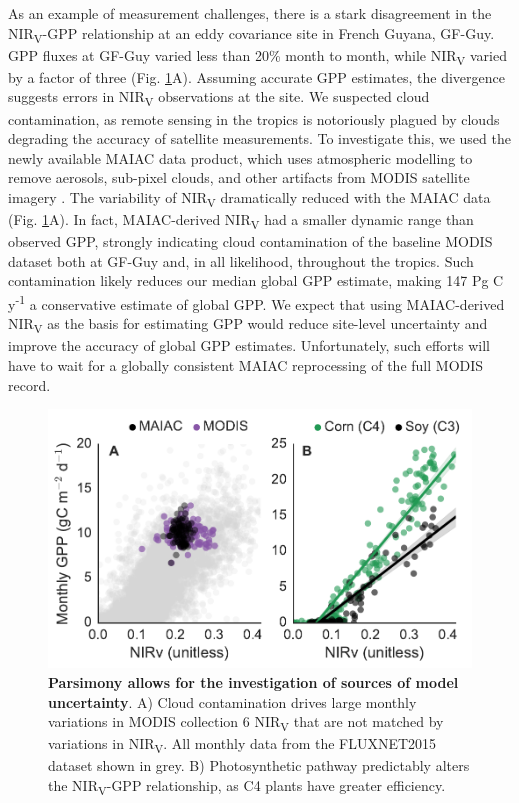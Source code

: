 \documentclass[10pt,letterpaper]{article}
\begin{document}
As an example of measurement challenges, there is a stark disagreement in the NIR\textsubscript{V}-GPP relationship at an eddy covariance site in French Guyana, GF-Guy. GPP fluxes at GF-Guy varied less than 20\% month to month, while NIR\textsubscript{V} varied by a factor of three (Fig. \ref{fig:parsimony_pluses}A). Assuming accurate GPP estimates, the divergence suggests errors in NIR\textsubscript{V} observations at the site. We suspected cloud contamination, as remote sensing in the tropics is notoriously plagued by clouds degrading the accuracy of satellite measurements. To investigate this, we used the newly available MAIAC data product, which uses atmospheric modelling to remove aerosols, sub-pixel clouds, and other artifacts from MODIS satellite imagery \cite{lyapustin2011multiangle}. The variability of NIR\textsubscript{V} dramatically reduced with the MAIAC data (Fig. \ref{fig:parsimony_pluses}A). In fact, MAIAC-derived NIR\textsubscript{V} had a smaller dynamic range than observed GPP, strongly indicating cloud contamination of the baseline MODIS dataset both at GF-Guy and, in all likelihood, throughout the tropics. Such contamination likely reduces our median global GPP estimate, making 147 Pg C y\textsuperscript{-1} a conservative estimate of global GPP.  We expect that using MAIAC-derived NIR\textsubscript{V} as the basis for estimating GPP would reduce site-level uncertainty and improve the accuracy of global GPP estimates. Unfortunately, such efforts will have to wait for a globally consistent MAIAC reprocessing of the full MODIS record.

\begin{figure}[h]
    \centering
    \includegraphics[width=11.4cm, keepaspectratio]{figure_parsimony.pdf}
    \caption{\textbf{Parsimony allows for the investigation of sources of model uncertainty}. A) Cloud contamination drives large monthly variations in MODIS collection 6 NIR\textsubscript{V} that are not matched by variations in NIR\textsubscript{V}. All monthly data from the FLUXNET2015 dataset shown in grey. B) Photosynthetic pathway predictably alters the NIR\textsubscript{V}-GPP relationship, as C4 plants have greater efficiency.}
    \label{fig:parsimony_pluses}
\end{figure}
\end{document}
